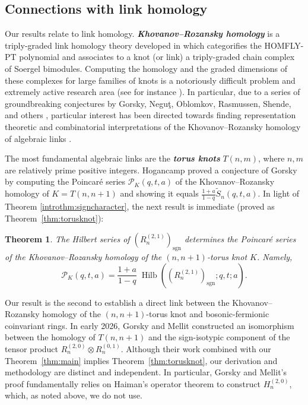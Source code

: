 \documentclass[11pt, noadjust, reqno]{amsart}
\newtheorem{introthm}{Theorem}
\theoremstyle{definition}
\theoremstyle{remark}
\numberwithin{equation}{section}
\newcommand{\0}{\emptyset}
\DeclareMathOperator{\Hilb}{Hilb}
\DeclareMathOperator{\sgn}{sgn}
\newcommand{\newword}[1]{\emph{\textbf{#1}}}
\begin{document}
\subsection{Connections with link homology} Our results relate to link homology. 
\newword{Khovanov--Rozansky homology} is a triply-graded link homology theory developed in \cite{KR1, KR2, Kh} which categorifies the HOMFLY-PT polynomial and associates to a knot (or link) a triply-graded chain complex of Soergel bimodules. 
Computing the homology and the graded dimensions of these complexes for large families of knots is a notoriously difficult problem and extremely active research area (see for instance \cite{aganagic, cherednik, EH16, CD16, CD17, hog-mellit, GMO, KT24, Mellit-Homology}). 
In particular, due to a series of groundbreaking conjectures by Gorsky, Negu\c{t}, Oblomkov, Rasmussen, Shende, and others \cite{Gorsky_Oblomkov_Rasmussen_Shende_2014, GorskyNegut, Gorsky-Catalan, GNR21, ORS, OS}, particular interest has been directed towards finding representation theoretic and combinatorial interpretations of the Khovanov--Rozansky homology of algebraic links \cite{CGHM, GL1, GL2, Hog17, GMV1, GMV2, Mellit}. 

The most fundamental algebraic links are the \newword{torus knots} $T(n,m)$, where $n,m$ are relatively prime positive integers. 
Hogancamp \cite{Hog17} proved a conjecture of Gorsky \cite{Gorsky-Catalan} by computing the Poincar\'e series $\mathcal{P}_K(q,t,a)$ of the Khovanov--Rozansky homology of $K= T(n,n+1)$ and showing it equals $\frac{1+a}{1-q}\widetilde{S}_n(q,t,a)$. 
In light of Theorem \ref{introthm:signcharacter}, the next result is immediate (proved as Theorem~\ref{thm:torusknot}):
\begin{introthm} The Hilbert series of  $(R_n^{(2,1)})_{\sgn}$ determines the Poincar\'e series of the Khovanov--Rozansky homology of the $(n,n+1)$-torus knot $K$. Namely, 
  \begin{equation*}\label{eq:intro-KR-(2,1)}
  \mathcal{P}_K(q,t,a) = \frac{1+a}{1-q} \; 
\Hilb((R_n^{(2,1)})_{\sgn}; q,t;a).
\end{equation*}
\end{introthm}
Our result is the second to establish a direct link between the Khovanov--Rozansky homology of the $(n,n+1)$-torus knot and bosonic-fermionic coinvariant rings. 
In early 2026, Gorsky and Mellit \cite{GorskyMellit} constructed an isomorphism between the homology of $T(n,n+1)$ and the sign-isotypic component of the tensor product $R_n^{(2,0)} \otimes R_n^{(0,1)}$. 
Although their work combined with our Theorem~\ref{thm:main} implies Theorem~\ref{thm:torusknot}, our derivation and methodology are distinct and independent. 
In particular, Gorsky and Mellit's proof fundamentally relies on Haiman's operator theorem \cite{Haiman1994, Haiman2002} to construct $H_n^{(2,0)}$, which, as noted above, we do not use.
\end{document}
